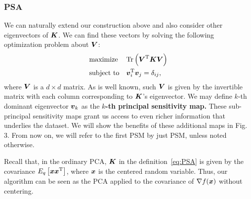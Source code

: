 \subsubsection{PSA}
%
We can naturally extend our construction above and also consider other
eigenvectors of $\mbox{\boldmath $K$}$.
%
We can find these vectors by solving the following optimization
problem about $\mbox{\boldmath $V$}$:
\begin{align}
\begin{split}
\begin{aligned}
& \text{maximize}
& & \mathrm{Tr}\left(\mbox{\boldmath $V$}^{\mathrm{T}} \mbox{\boldmath $K$} \mbox{\boldmath $V$}\right) \\
& \text{subject to}
& & \mbox{\boldmath $v$}_i^{\mathrm{T}}\mbox{\boldmath $v$}_j = \delta_{ij},
\end{aligned}
\end{split} \label{eq:PSA}
\end{align}
%
where $\mbox{\boldmath $V$}$ is a $d \times d$ matrix. As is well known, such $\mbox{\boldmath $V$}$ is given by
the invertible matrix with each column corresponding to $\mbox{\boldmath $K$}$'s
eigenvector.
%
We may define $k$-th dominant eigenvector $\mbox{\boldmath $v$}_{k}$ as
the \textbf{$k$-th principal sensitivity map.} These sub-principal sensitivity maps grant us
access to even richer information that underlies the dataset.
%
We will show the benefits of these additional maps in Fig.\,3.
From now on, we will refer to the first PSM by just PSM, unless noted otherwise.

Recall that, in the ordinary PCA,  $\mbox{\boldmath $K$}$ in the definition~\eqref{eq:PSA} is given by the covariance
$E_q\left[ \mbox{\boldmath $x$} \mbox{\boldmath $x$}^{\mathrm{T}} \right]$, where $\mbox{\boldmath $x$}$ is the
centered random variable.
%
Thus, our algorithm can be seen as the PCA
applied to the covariance of $\nabla f(\mbox{\boldmath $x$})$ without centering.

